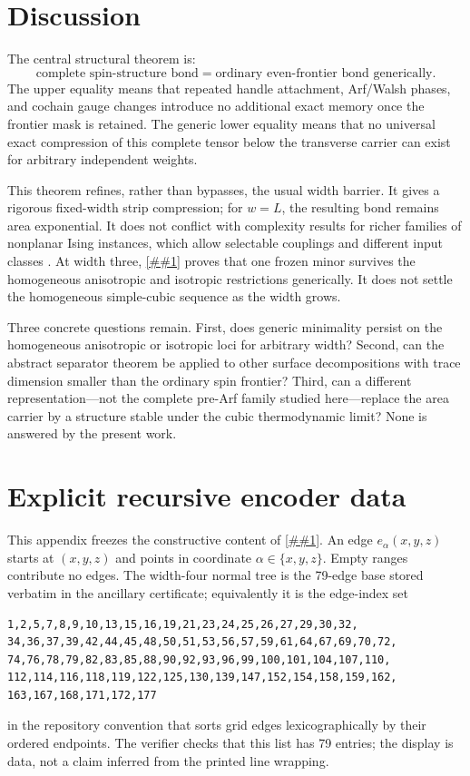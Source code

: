 \documentclass[11pt]{article}
\newcommand{\cref}[1]{\autoref{##1}}%
\begin{document}
\section{Discussion}

The central structural theorem is:
\[
 \boxed{\text{complete spin-structure bond}
        =\text{ordinary even-frontier bond generically}.}
\]
The upper equality means that repeated handle attachment, Arf/Walsh phases,
and cochain gauge changes introduce no additional exact memory once the
frontier mask is retained.  The generic lower equality means that no
universal exact compression of this complete tensor below the transverse
carrier can exist for arbitrary independent weights.

This theorem refines, rather than bypasses, the usual width barrier.  It gives
a rigorous fixed-width strip compression; for \(w=L\), the resulting bond
remains area exponential.  It
does not conflict with complexity results for richer
families of nonplanar Ising instances, which allow selectable couplings and
different input classes \cite{Istrail2000}.  At width three,
\cref{thm:w3-homogeneous} proves that one frozen minor survives the
homogeneous anisotropic and isotropic restrictions generically.  It does not
settle the homogeneous simple-cubic sequence as the width grows.

Three concrete questions remain.  First, does generic minimality persist on
the homogeneous anisotropic or isotropic loci for arbitrary width?  Second,
can the abstract
separator theorem be applied to other surface decompositions with trace
dimension smaller than the ordinary spin frontier?  Third, can a different
representation---not the complete pre-Arf family studied here---replace the
area carrier by a structure stable under the cubic thermodynamic limit?
None is answered by the present work.

\appendix

\section{Explicit recursive encoder data}\label{app:encoders}

This appendix freezes the constructive content of \cref{lem:encoders}.  An
edge \(e_\alpha(x,y,z)\) starts at \((x,y,z)\) and points in coordinate
\(\alpha\in\{x,y,z\}\).  Empty ranges contribute no edges.  The width-four
normal tree is the 79-edge base stored verbatim in the ancillary certificate;
equivalently it is the edge-index set
\begin{verbatim}
1,2,5,7,8,9,10,13,15,16,19,21,23,24,25,26,27,29,30,32,
34,36,37,39,42,44,45,48,50,51,53,56,57,59,61,64,67,69,70,72,
74,76,78,79,82,83,85,88,90,92,93,96,99,100,101,104,107,110,
112,114,116,118,119,122,125,130,139,147,152,154,158,159,162,
163,167,168,171,172,177
\end{verbatim}
in the repository convention that sorts grid edges lexicographically by
their ordered endpoints.  The verifier checks that this list has 79 entries;
the display is data, not a claim inferred from the printed line wrapping.
\end{document}
